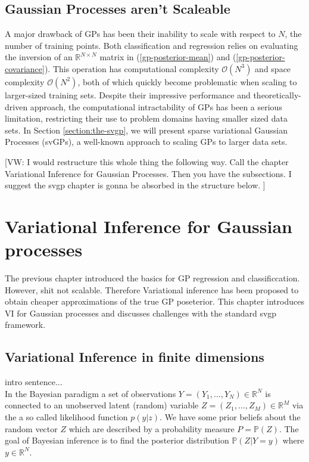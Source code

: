 \documentclass{article}
\newcommand{\vw}[1]{{\color{green} [VW: #1]}}
\newcommand{\bbP}{\mathbb{P}}
\newcommand{\bbR}{\mathbb{R}}
\numberwithin{equation}{section}
\begin{document}
\subsection{Gaussian Processes aren't Scaleable}\label{section:gp-problems}
A major drawback of GPs has been their inability to scale with respect to $N$, the number of training points. Both classification and regression relies on evaluating the inversion of an $\mathbb{R}^{N \times N}$ matrix in (\ref{gp-posterior-mean}) and (\ref{gp-posterior-covariance}). This operation has computational complexity $\mathcal{O}(N^3)$ and space complexity $\mathcal{O}(N^2)$, both of which quickly become problematic when scaling to larger-sized training sets. Despite their impressive performance and theoretically-driven approach, the computational intractability of GPs has been a serious limitation, restricting their use to problem domains having smaller sized data sets. In Section \ref{section:the-svgp}, we will present sparse variational Gaussian Processes (svGPs), a well-known approach to scaling GPs to larger data sets.

\newpage

\vw{I would restructure this whole thing the following way. Call the chapter Variational Inference for Gaussian Processes. Then you have the subsections. I suggest the svgp chapter is gonna be absorbed in the structure below.  }


\section{Variational Inference for Gaussian processes}
The previous chapter introduced the basics for GP regression and classificcation. However, shit not scalable. Therefore Variational inference has been proposed to obtain cheaper approximations of the true GP poseterior. This chapter introduces VI for Gaussian processes and discusses challenges with the standard svgp framework.

\subsection{Variational Inference in finite dimensions}
intro sentence... \\

In the Bayesian paradigm a set of observations $Y=(Y_1, \hdots, Y_N) \in \bbR^N$ is connected to an unobserved latent (random) variable $Z=(Z_1, \hdots, Z_M) \in \bbR^M$ via the a so called likelihood function $p(y|z)$. We have some prior beliefs about the random vector $Z$ which are described by a probability measure $P=\bbP(Z)$. The goal of Bayesian inference is to find  the posterior distribution $\bbP(Z|Y=y)$ where $y \in \bbR^N$. 
\end{document}
